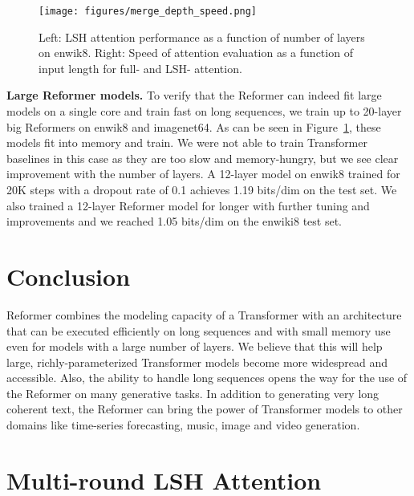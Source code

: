 \documentclass{article} \usepackage{iclr2020_conference,times}
\renewcommand{\paragraph}[1]{\textbf{#1}}
\begin{document}
\begin{figure}[!t]
    \centering
    \texttt{[image: figures/merge\_depth\_speed.png]}
    \caption{Left: LSH attention performance as a function of number of layers on enwik8. 
    Right: Speed of attention evaluation as a function of input length for full- and LSH- attention.}
    \label{fig:layer-curves}
\end{figure}


\paragraph{Large Reformer models.} \label{sec:exp_large}
To verify that the Reformer can indeed fit large models on a single core
and train fast on long sequences, we train up to 20-layer big Reformers on enwik8 and imagenet64.
As can be seen in Figure~\ref{fig:layer-curves}, these models
fit into memory and train. We were not able to train Transformer baselines
in this case as they are too slow and memory-hungry, but we see clear improvement
with the number of layers. A 12-layer model on enwik8 trained for 20K steps with a dropout rate of 0.1 achieves 1.19 bits/dim on the test set. We also trained a 12-layer Reformer model for longer with
further tuning and improvements and we reached 1.05 bits/dim on the enwiki8 test
set.


\section{Conclusion}

Reformer combines the modeling capacity of a Transformer with an architecture that can be executed efficiently on long sequences and with small memory
use even for models with a large number of layers.
We believe that this will help large, richly-parameterized Transformer models become more widespread and accessible. 
Also, the ability to handle long sequences opens the way for the use of
the Reformer on many generative tasks. In addition to generating very long
coherent text, the Reformer can bring the power of Transformer models to other
domains like time-series forecasting, music, image and video generation.




\newpage
\appendix
\section{Multi-round LSH Attention} \label{sec:multi-round-detail}
\end{document}
